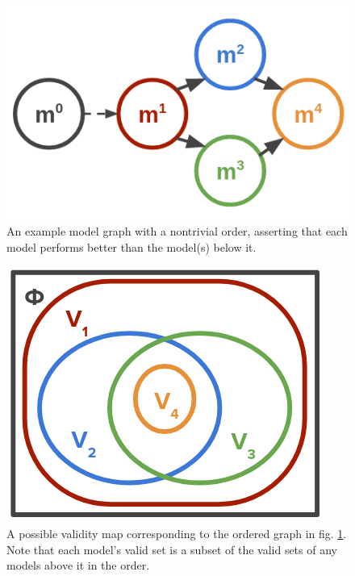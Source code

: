 \documentclass[letterpaper, 10 pt, conference]{ieeeconf}
\begin{document}
\begin{figure}[htbp]
    \centerline{\includegraphics[width=0.9\columnwidth]{img/model_tree3.png}}
    \caption{An example model graph with a nontrivial order, asserting that each model performs better than the model(s) below it.}
    \label{fig:modeltree}
\end{figure}

\begin{figure}[htbp]
    \centerline{\includegraphics[width=0.9\columnwidth]{img/v_map.png}}
    \caption{A possible validity map corresponding to the ordered graph in fig. \ref{fig:modeltree}. Note that each model's valid set is a subset of the valid sets of any models above it in the order.}
    \label{fig:vmap}
\end{figure}
\end{document}
